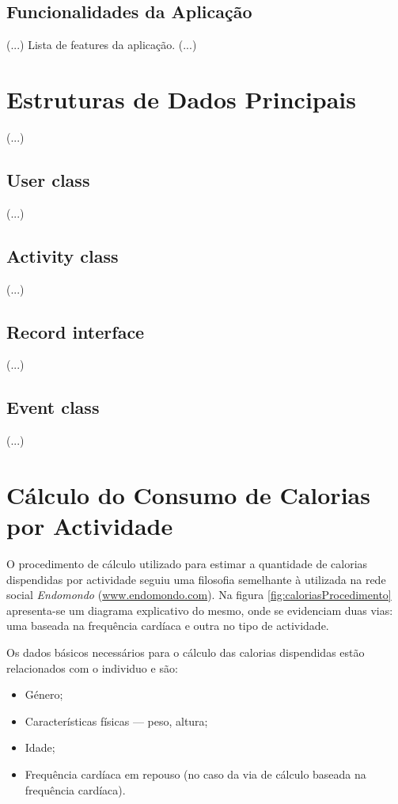 \documentclass[a4paper,10pt]{report}
\begin{document}
\section{Funcionalidades da Aplicação}
\label{sec:funcionalidades}
(...)
Lista de features da aplicação.
(...)

\chapter{Estruturas de Dados Principais}
\label{cap:estruturas}
(...)
\section{User class}
\label{sec:user}
(...)
\section{Activity class}
\label{sec:activity}
(...)
\section{Record interface}
\label{sec:interface}
(...)
\section{Event class}
\label{sec:event}
(...)

\chapter{Cálculo do Consumo de Calorias por Actividade}
\label{cap:calorias}
O procedimento de cálculo utilizado para estimar a quantidade de calorias dispendidas por actividade seguiu uma filosofia semelhante à utilizada 
na rede social \emph{Endomondo} (\url{www.endomondo.com}). 
Na figura \ref{fig:caloriasProcedimento} apresenta-se um diagrama explicativo do mesmo, onde se evidenciam duas vias: uma baseada na frequência 
cardíaca e outra no tipo de actividade.

Os dados básicos necessários para o cálculo das calorias dispendidas estão relacionados com o individuo e são:
\begin{itemize}
 \item Género;
 \item Características físicas --- peso, altura;
 \item Idade;
 \item Frequência cardíaca em repouso (no caso da via de cálculo baseada na frequência cardíaca).
\end{itemize}
\end{document}
